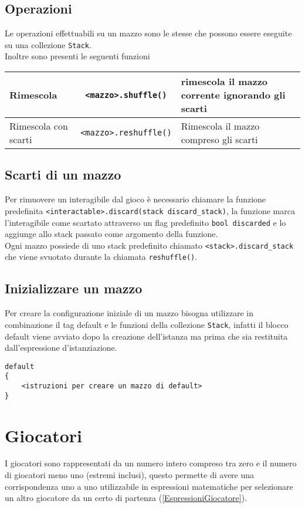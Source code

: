 \subsection{Operazioni}
Le operazioni effettuabili su un mazzo sono le stesse che possono essere eseguite su una 
collezione \lstinline|Stack|. \\
Inoltre sono presenti le seguenti funzioni
\begin{center}
\begin{tabularx}{\linewidth}{|l|c|X|}
    \hline
    Rimescola & \lstinline|<mazzo>.shuffle()| & rimescola il mazzo corrente ignorando gli scarti \\
    \hline
    Rimescola con scarti & \lstinline|<mazzo>.reshuffle()| & Rimescola il mazzo compreso gli scarti \\ 
    \hline
\end{tabularx}
\end{center}

\subsection{Scarti di un mazzo}
Per rimuovere un interagibile dal gioco è necessario chiamare la funzione predefinita 
\lstinline|<interactable>.discard(stack discard_stack)|, la funzione marca l'interagibile come scartato
attraverso un flag predefinito \lstinline|bool discarded| e lo aggiunge allo stack passato 
come argomento della funzione. \\
Ogni mazzo possiede di uno stack predefinito chiamato \lstinline|<stack>.discard_stack| che 
viene svuotato durante la chiamata \lstinline|reshuffle()|.

\subsection{Inizializzare un mazzo}
Per creare la configurazione iniziale di un mazzo bisogna utilizzare in combinazione il tag 
default e le funzioni della collezione \lstinline|Stack|,  
infatti il blocco default viene avviato dopo la creazione dell'istanza 
ma prima che sia restituita dall'espressione d'istanziazione. \\
\begin{lstlisting}
default
{
    <istruzioni per creare un mazzo di default> 
}
\end{lstlisting}

\section{Giocatori}
I giocatori sono rappresentati da un numero intero compreso tra zero e il numero di giocatori meno uno (estremi inclusi),
questo permette di avere una corrispondenza uno a uno utilizzabile in espressioni matematiche
per selezionare un altro giocatore da un certo di partenza (\ref{EspressioniGiocatore}). \\

